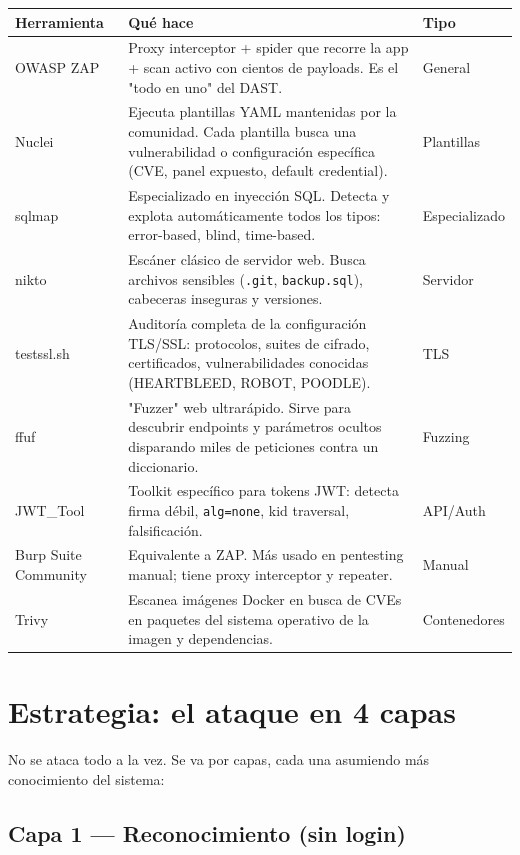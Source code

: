 \documentclass[12pt,a4paper,oneside]{article}
\begin{document}
\begin{longtable}{p{3cm}p{8.5cm}p{2cm}}
\toprule
\textbf{Herramienta} & \textbf{Qué hace} & \textbf{Tipo} \\
\midrule
\endhead
OWASP ZAP & Proxy interceptor + spider que recorre la app + scan activo con cientos de payloads. Es el "todo en uno" del DAST. & General \\
Nuclei & Ejecuta plantillas YAML mantenidas por la comunidad. Cada plantilla busca una vulnerabilidad o configuración específica (CVE, panel expuesto, default credential). & Plantillas \\
sqlmap & Especializado en inyección SQL. Detecta y explota automáticamente todos los tipos: error-based, blind, time-based. & Especializado \\
nikto & Escáner clásico de servidor web. Busca archivos sensibles (\texttt{.git}, \texttt{backup.sql}), cabeceras inseguras y versiones. & Servidor \\
testssl.sh & Auditoría completa de la configuración TLS/SSL: protocolos, suites de cifrado, certificados, vulnerabilidades conocidas (HEARTBLEED, ROBOT, POODLE). & TLS \\
ffuf & "Fuzzer" web ultrarápido. Sirve para descubrir endpoints y parámetros ocultos disparando miles de peticiones contra un diccionario. & Fuzzing \\
JWT\_Tool & Toolkit específico para tokens JWT: detecta firma débil, \texttt{alg=none}, kid traversal, falsificación. & API/Auth \\
Burp Suite Community & Equivalente a ZAP. Más usado en pentesting manual; tiene proxy interceptor y repeater. & Manual \\
Trivy & Escanea imágenes Docker en busca de CVEs en paquetes del sistema operativo de la imagen y dependencias. & Contenedores \\
\bottomrule
\end{longtable}

\section{Estrategia: el ataque en 4 capas}

No se ataca todo a la vez. Se va por capas, cada una asumiendo más conocimiento del sistema:

\subsection{Capa 1 --- Reconocimiento (sin login)}
\end{document}
